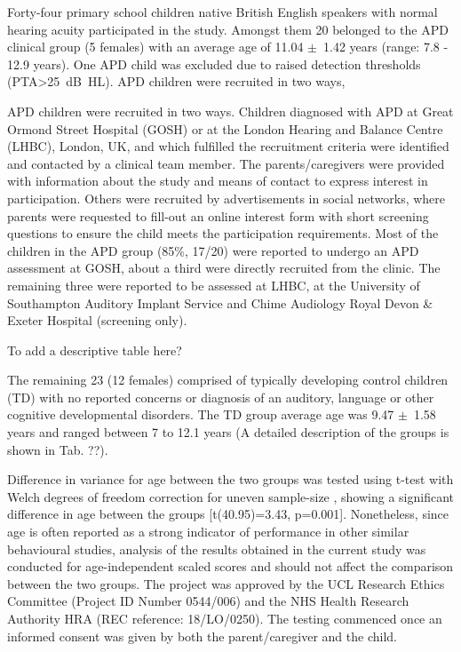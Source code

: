 \documentclass[a4paper, twoside]{templates/ociamthesis}
\begin{document}
Forty-four primary school children native British English speakers with normal hearing acuity participated in the study. Amongst them 20 belonged to the APD clinical group (5 females) with an average age of 11.04 \(\pm\)~1.42 years (range: 7.8 - 12.9 years). One APD child was excluded due to raised detection thresholds (PTA\textgreater25~dB~HL). APD children were recruited in two ways,

APD children were recruited in two ways. Children diagnosed with APD at Great Ormond Street Hospital (GOSH) or at the London Hearing and Balance Centre (LHBC), London, UK, and which fulfilled the recruitment criteria were identified and contacted by a clinical team member. The parents/caregivers were provided with information about the study and means of contact to express interest in participation. Others were recruited by advertisements in social networks, where parents were requested to fill-out an online interest form with short screening questions to ensure the child meets the participation requirements. Most of the children in the APD group (85\%, 17/20) were reported to undergo an APD assessment at GOSH, about a third were directly recruited from the clinic. The remaining three were reported to be assessed at LHBC, at the University of Southampton Auditory Implant Service and Chime Audiology Royal Devon \& Exeter Hospital (screening only).

\colorbox[HTML]{CCCCFF}{To add a descriptive table here?}

The remaining 23 (12 females) comprised of typically developing control children (TD) with no reported concerns or diagnosis of an auditory, language or other cognitive developmental disorders. The TD group average age was 9.47 \(\pm\)~1.58 years and ranged between 7 to 12.1 years (A detailed description of the groups is shown in Tab. ??).

Difference in variance for age between the two groups was tested using t-test with Welch degrees of freedom correction for uneven sample-size \autocite[independent-samples with bootstrapping n=9999; MKinfer package;][]{MKinferPackageR}, showing a significant difference in age between the groups {[}t(40.95)=3.43, p=0.001{]}. Nonetheless, since age is often reported as a strong indicator of performance in other similar behavioural studies, analysis of the results obtained in the current study was conducted for age-independent scaled scores and should not affect the comparison between the two groups. The project was approved by the UCL Research Ethics Committee (Project ID Number 0544/006) and the NHS Health Research Authority HRA (REC reference: 18/LO/0250). The testing commenced once an informed consent was given by both the parent/caregiver and the child.
\end{document}

